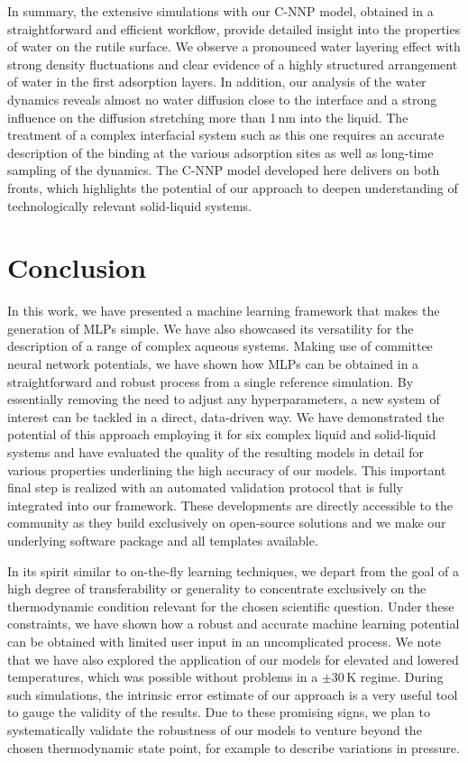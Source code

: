 \documentclass[aip,jcp,amsmath,amssymb,floatfix,reprint,citeautoscript,noeprint]{revtex4-1}
\begin{document}
\begin{bibunit}
%
In summary, the extensive simulations with our 
C-NNP model, obtained in a straightforward and efficient
workflow, provide detailed insight into the
properties of water on the rutile surface.
%
%
%
%
We observe a pronounced water layering effect with strong density fluctuations and clear evidence of a highly structured arrangement of water
in the first adsorption layers.
%
In addition, our analysis of the water dynamics reveals almost no water diffusion
close to the interface and a strong influence on the diffusion stretching more than 1\,nm into the liquid.
%
The treatment of a complex interfacial system such as this one requires an accurate description of the binding at the various adsorption sites as well as long-time sampling of the dynamics. 
%
The C-NNP model developed here delivers on both fronts, which highlights the potential of our approach to deepen understanding of technologically relevant solid-liquid systems.


%
%
%
%
%
\section*{Conclusion}
\label{sec:con}
%

%
In this work, we have presented a
machine learning framework that makes the generation of MLPs simple.
%
We have also showcased its versatility for
the description of a range of
complex aqueous systems.
%
Making use of committee neural network potentials,
we have shown how
MLPs can be obtained in a straightforward and robust process
from a single reference simulation.
%
By essentially removing the need to adjust any hyperparameters, a
new system of interest can be tackled
in a direct, data-driven way.
%
We have demonstrated the potential of this approach
employing it for six complex liquid and solid-liquid systems and have evaluated
the quality of the resulting models in detail
for various properties underlining the high accuracy
of our models.
%
This important final step is realized with an automated validation protocol that is fully integrated into
our framework.
%
These developments are directly accessible to the community
as they build exclusively on open-source solutions
and we make our underlying software package and all templates available.

%
In its spirit similar to on-the-fly learning techniques, we depart from the goal of a high degree of
transferability or generality to concentrate
exclusively on the thermodynamic condition relevant for the
chosen scientific question.
%
Under these constraints, we have shown how a
robust and accurate machine learning potential can be obtained
with limited user input in an uncomplicated process.
%
We note that we have also explored the application of our models
for elevated and lowered temperatures, which was possible without
problems in a $\pm$30\,K regime.
%
During such simulations, the intrinsic error estimate of our approach is a very useful tool to gauge the validity of the results.
%
Due to these promising signs, we plan to systematically validate the robustness of our models to venture beyond the chosen thermodynamic state point, for example to describe variations in pressure.
%


\end{bibunit}
\end{document}
